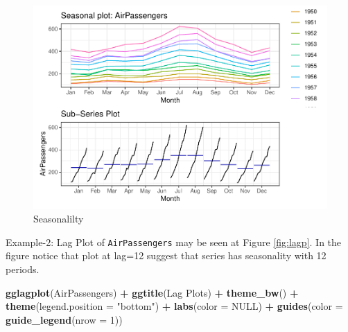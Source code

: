 \documentclass[
]{book}
\newenvironment{Shaded}{\begin{snugshade}}{\end{snugshade}}
\newcommand{\AttributeTok}[1]{\textcolor[rgb]{0.13,0.29,0.53}{#1}}
\newcommand{\ConstantTok}[1]{\textcolor[rgb]{0.56,0.35,0.01}{#1}}
\newcommand{\DecValTok}[1]{\textcolor[rgb]{0.00,0.00,0.81}{#1}}
\newcommand{\FunctionTok}[1]{\textcolor[rgb]{0.13,0.29,0.53}{\textbf{#1}}}
\newcommand{\NormalTok}[1]{#1}
\newcommand{\SpecialCharTok}[1]{\textcolor[rgb]{0.81,0.36,0.00}{\textbf{#1}}}
\newcommand{\StringTok}[1]{\textcolor[rgb]{0.31,0.60,0.02}{#1}}
\begin{document}
\begin{figure}

{\centering \includegraphics{DauR_files/figure-latex/unnamed-chunk-353-1} 

}

\caption{Seasonalilty}\label{fig:unnamed-chunk-353}
\end{figure}

Example-2: Lag Plot of \texttt{AirPassengers} may be seen at Figure \ref{fig:lagp}. In the figure notice that plot at lag=12 suggest that series has seasonality with 12 periods.

\begin{Shaded}
\begin{Highlighting}[]
\FunctionTok{gglagplot}\NormalTok{(AirPassengers) }\SpecialCharTok{+}
  \FunctionTok{ggtitle}\NormalTok{(}\StringTok{\textquotesingle{}Lag Plots\textquotesingle{}}\NormalTok{) }\SpecialCharTok{+}
  \FunctionTok{theme\_bw}\NormalTok{() }\SpecialCharTok{+}
  \FunctionTok{theme}\NormalTok{(}\AttributeTok{legend.position =} \StringTok{"bottom"}\NormalTok{) }\SpecialCharTok{+}
  \FunctionTok{labs}\NormalTok{(}\AttributeTok{color =} \ConstantTok{NULL}\NormalTok{) }\SpecialCharTok{+}
  \FunctionTok{guides}\NormalTok{(}\AttributeTok{color =} \FunctionTok{guide\_legend}\NormalTok{(}\AttributeTok{nrow =} \DecValTok{1}\NormalTok{))}
\end{Highlighting}
\end{Shaded}
\end{document}
